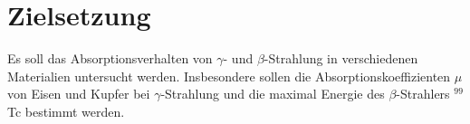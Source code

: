 
\section{Zielsetzung}
\label{sec:Zielsetzung}
Es soll das Absorptionsverhalten von $\gamma$- und $\beta$-Strahlung in verschiedenen Materialien untersucht werden.
Insbesondere sollen die Absorptionskoeffizienten $\mu$ von Eisen und Kupfer bei $\gamma$-Strahlung und die maximal Energie des $\beta$-Strahlers $^99$Tc bestimmt werden.